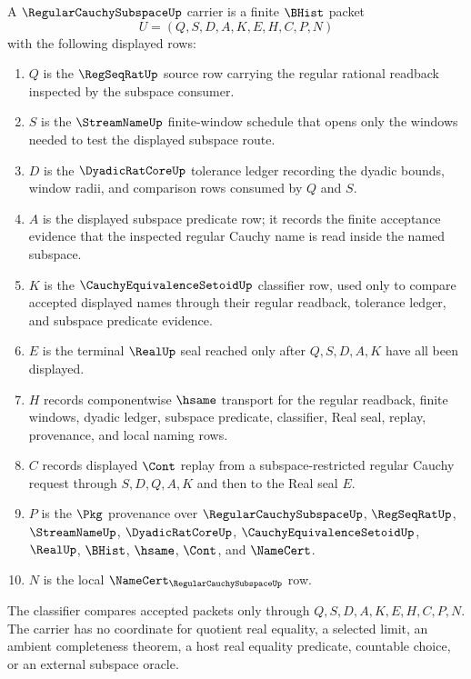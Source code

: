 \begin{definition}
\label{def:regular-cauchy-subspace-carrier}
A $\RegularCauchySubspaceUp$ carrier is a finite $\BHist$ packet
$$
U=(Q,S,D,A,K,E,H,C,P,N)
$$
with the following displayed rows:
\begin{enumerate}
\item $Q$ is the $\RegSeqRatUp$ source row carrying the regular rational readback inspected by the subspace consumer.
\item $S$ is the $\StreamNameUp$ finite-window schedule that opens only the windows needed to test the displayed subspace route.
\item $D$ is the $\DyadicRatCoreUp$ tolerance ledger recording the dyadic bounds, window radii, and comparison rows consumed by $Q$ and $S$.
\item $A$ is the displayed subspace predicate row; it records the finite acceptance evidence that the inspected regular Cauchy name is read inside the named subspace.
\item $K$ is the $\CauchyEquivalenceSetoidUp$ classifier row, used only to compare accepted displayed names through their regular readback, tolerance ledger, and subspace predicate evidence.
\item $E$ is the terminal $\RealUp$ seal reached only after $Q,S,D,A,K$ have all been displayed.
\item $H$ records componentwise $\hsame$ transport for the regular readback, finite windows, dyadic ledger, subspace predicate, classifier, Real seal, replay, provenance, and local naming rows.
\item $C$ records displayed $\Cont$ replay from a subspace-restricted regular Cauchy request through $S,D,Q,A,K$ and then to the Real seal $E$.
\item $P$ is the $\Pkg$ provenance over $\RegularCauchySubspaceUp$, $\RegSeqRatUp$, $\StreamNameUp$, $\DyadicRatCoreUp$, $\CauchyEquivalenceSetoidUp$, $\RealUp$, $\BHist$, $\hsame$, $\Cont$, and $\NameCert$.
\item $N$ is the local $\NameCert_{\RegularCauchySubspaceUp}$ row.
\end{enumerate}
The classifier compares accepted packets only through $Q,S,D,A,K,E,H,C,P,N$. The carrier has no coordinate for quotient real equality, a selected limit, an ambient completeness theorem, a host real equality predicate, countable choice, or an external subspace oracle.
\end{definition}

